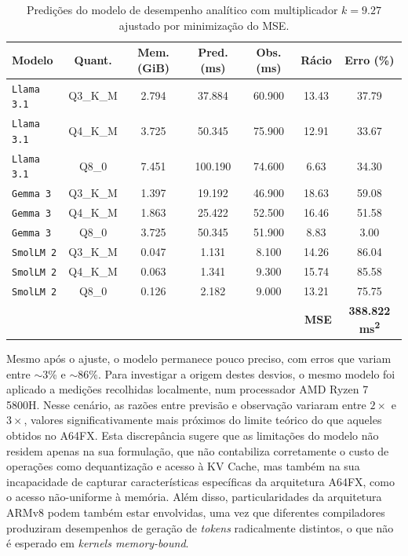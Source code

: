 \documentclass[11pt, a4paper]{article}
\begin{document}
\begin{table}[H]
    \centering
    \begin{tabular}{|l|c|c|c|c|c|c|}
        \hline
        \textbf{Modelo}     &
        \textbf{Quant.}     &
        \textbf{Mem. (GiB)} &
        \textbf{Pred. (ms)} &
        \textbf{Obs. (ms)}  &
        \textbf{Rácio}      &
        \textbf{Erro (\%)}  \\ \hline

        \texttt{Llama 3.1} & Q3\_K\_M &  2.794 &  37.884 & 60.900 & 13.43 & 37.79 \\ \hline
        \texttt{Llama 3.1} & Q4\_K\_M &  3.725 &  50.345 & 75.900 & 12.91 & 33.67 \\ \hline
        \texttt{Llama 3.1} & Q8\_0    &  7.451 & 100.190 & 74.600 &  6.63 & 34.30 \\ \hline
        \texttt{Gemma 3}   & Q3\_K\_M &  1.397 &  19.192 & 46.900 & 18.63 & 59.08 \\ \hline
        \texttt{Gemma 3}   & Q4\_K\_M &  1.863 &  25.422 & 52.500 & 16.46 & 51.58 \\ \hline
        \texttt{Gemma 3}   & Q8\_0    &  3.725 &  50.345 & 51.900 &  8.83 &  3.00 \\ \hline
        \texttt{SmolLM 2}  & Q3\_K\_M &  0.047 &   1.131 &  8.100 & 14.26 & 86.04 \\ \hline
        \texttt{SmolLM 2}  & Q4\_K\_M &  0.063 &   1.341 &  9.300 & 15.74 & 85.58 \\ \hline
        \texttt{SmolLM 2}  & Q8\_0    &  0.126 &   2.182 &  9.000 & 13.21 & 75.75 \\ \hline

        \multicolumn{6}{|r|}{\textbf{MSE}} & \textbf{388.822 ms\textsuperscript{2}} \\ \hline
    \end{tabular}

    \caption{
        \onehalfspacing
        Predições do modelo de desempenho analítico com multiplicador $k = 9.27$ ajustado por
        minimização do MSE.
    }
    \label{model-fit}
\end{table}

Mesmo após o ajuste, o modelo permanece pouco preciso, com erros que variam entre $\sim$3\% e
$\sim$86\%. Para investigar a origem destes desvios, o mesmo modelo foi aplicado a medições
recolhidas localmente, num processador AMD Ryzen 7 5800H. Nesse cenário, as razões entre previsão e
observação variaram entre $2\times$ e $3\times$, valores significativamente mais próximos do limite
teórico do que aqueles obtidos no A64FX. Esta discrepância sugere que as limitações do modelo não
residem apenas na sua formulação, que não contabiliza corretamente o custo de operações como
dequantização e acesso à KV Cache, mas também na sua incapacidade de capturar características
específicas da arquitetura A64FX, como o acesso não-uniforme à memória. Além disso, particularidades
da arquitetura ARMv8 podem também estar envolvidas, uma vez que diferentes compiladores produziram
desempenhos de geração de \emph{tokens} radicalmente distintos, o que não é esperado em
\emph{kernels memory-bound}.
\end{document}
